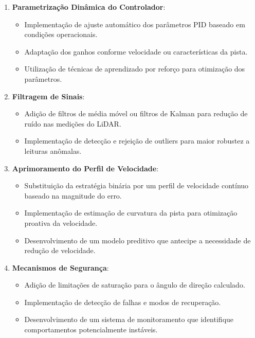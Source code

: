 \begin{enumerate}
    \item \textbf{Parametrização Dinâmica do Controlador}:
          \begin{itemize}
              \item Implementação de ajuste automático dos parâmetros PID baseado em condições
                    operacionais.
              \item Adaptação dos ganhos conforme velocidade ou características da pista.
              \item Utilização de técnicas de aprendizado por reforço para otimização dos
                    parâmetros.
          \end{itemize}

    \item \textbf{Filtragem de Sinais}:
          \begin{itemize}
              \item Adição de filtros de média móvel ou filtros de Kalman para redução de ruído nas
                    medições do LiDAR.
              \item Implementação de detecção e rejeição de outliers para maior robustez a leituras
                    anômalas.
          \end{itemize}

    \item \textbf{Aprimoramento do Perfil de Velocidade}:
          \begin{itemize}
              \item Substituição da estratégia binária por um perfil de velocidade contínuo baseado
                    na magnitude do erro.
              \item Implementação de estimação de curvatura da pista para otimização proativa da
                    velocidade.
              \item Desenvolvimento de um modelo preditivo que antecipe a necessidade de redução de
                    velocidade.
          \end{itemize}

    \item \textbf{Mecanismos de Segurança}:
          \begin{itemize}
              \item Adição de limitações de saturação para o ângulo de direção calculado.
              \item Implementação de detecção de falhas e modos de recuperação.
              \item Desenvolvimento de um sistema de monitoramento que identifique comportamentos
                    potencialmente instáveis.
          \end{itemize}


\end{enumerate}
